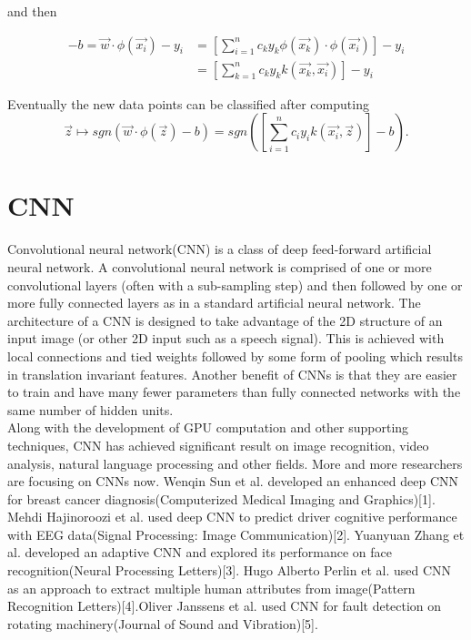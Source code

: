 \documentclass{kththesis}
\begin{document}
and then

\begin{align*}
-b = \vec{w} \cdot \phi(\vec{x_{i}})-y_{i} & = \left[\sum^{n}_{i=1}c_{k}y_{k}\phi(\vec{x_{k}})\cdot \phi(\vec{x_{i}}) \right] - y_{i}\\
& =\left[\sum^{n}_{k=1}c_{k}y_{k}k(\vec{x_{k}}, \vec{x_{i}})\right] - y_{i}
\end{align*}

Eventually the new data points can be classified after computing
\begin{equation}
\vec{z} \mapsto sgn(\vec{w} \cdot \phi(\vec{z})-b) = sgn \left(\left[ \sum^{n}_{i=1}c_{i}y_{i}k(\vec{x_{i}}, \vec{z}) \right] - b \right).
\end{equation}

\section{CNN}
Convolutional neural network(CNN) is a class of deep feed-forward artificial neural network. A convolutional neural network is comprised of one or more convolutional layers (often with a sub-sampling step) and then followed by one or more fully connected layers as in a standard artificial neural network. The architecture of a CNN is designed to take advantage of the 2D structure of an input image (or other 2D input such as a speech signal). This is achieved with local connections and tied weights followed by some form of pooling which results in translation invariant features. Another benefit of CNNs is that they are easier to train and have many fewer parameters than fully connected networks with the same number of hidden units.\\
Along with the development of GPU computation and other supporting techniques, CNN has achieved significant result on image recognition, video analysis, natural language processing and other fields. More and more researchers are focusing on CNNs now. Wenqin Sun et al. developed an enhanced deep CNN for breast cancer diagnosis(Computerized Medical Imaging and Graphics)[1]. Mehdi Hajinoroozi et al. used deep CNN to predict driver cognitive performance with EEG data(Signal Processing: Image Communication)[2]. Yuanyuan Zhang et al. developed an adaptive CNN and explored its performance on face recognition(Neural Processing Letters)[3]. Hugo Alberto Perlin et al. used CNN as an approach to extract multiple human attributes from image(Pattern Recognition Letters)[4].Oliver Janssens et al. used CNN for fault detection on rotating machinery(Journal of Sound and Vibration)[5].
\end{document}
